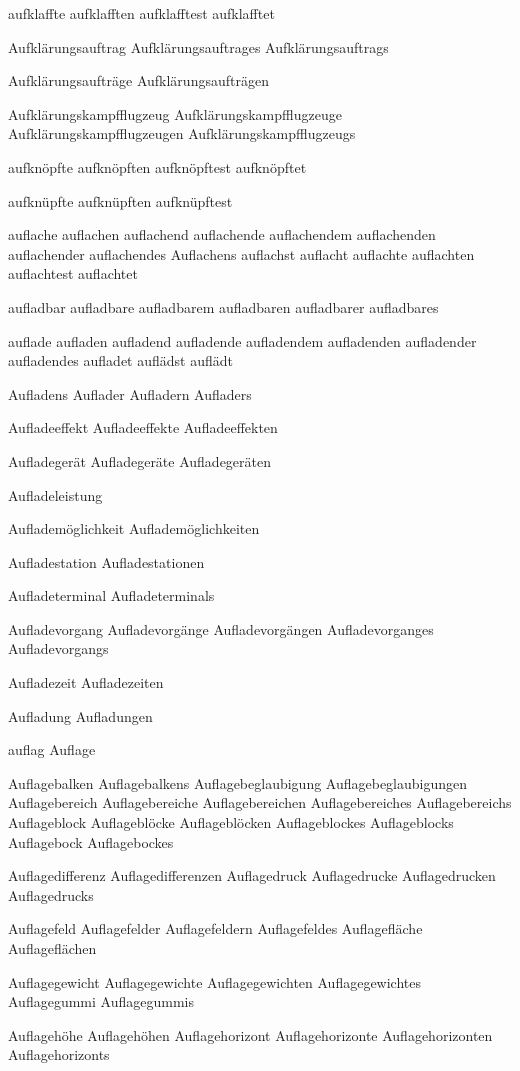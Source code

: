aufklaffte
aufklafften
aufklafftest
aufklafftet

Aufklärungsauftrag
Aufklärungsauftrages
Aufklärungsauftrags

Aufklärungsaufträge
Aufklärungsaufträgen

Aufklärungskampfflugzeug
Aufklärungskampfflugzeuge
Aufklärungskampfflugzeugen
Aufklärungskampfflugzeugs

aufknöpfte
aufknöpften
aufknöpftest
aufknöpftet

aufknüpfte
aufknüpften
aufknüpftest

auflache
auflachen
auflachend
auflachende
auflachendem
auflachenden
auflachender
auflachendes
Auflachens
auflachst
auflacht
auflachte
auflachten
auflachtest
auflachtet

aufladbar
aufladbare
aufladbarem
aufladbaren
aufladbarer
aufladbares

auflade
aufladen
aufladend
aufladende
aufladendem
aufladenden
aufladender
aufladendes
aufladet
auflädst
auflädt

Aufladens
Auflader
Aufladern
Aufladers

Aufladeeffekt
Aufladeeffekte
Aufladeeffekten

Aufladegerät
Aufladegeräte
Aufladegeräten

Aufladeleistung

Auflademöglichkeit
Auflademöglichkeiten

Aufladestation
Aufladestationen

Aufladeterminal
Aufladeterminals

Aufladevorgang
Aufladevorgänge
Aufladevorgängen
Aufladevorganges
Aufladevorgangs

Aufladezeit
Aufladezeiten

Aufladung
Aufladungen

auflag
Auflage

Auflagebalken
Auflagebalkens
Auflagebeglaubigung
Auflagebeglaubigungen
Auflagebereich
Auflagebereiche
Auflagebereichen
Auflagebereiches
Auflagebereichs
Auflageblock
Auflageblöcke
Auflageblöcken
Auflageblockes
Auflageblocks
Auflagebock
Auflagebockes

Auflagedifferenz
Auflagedifferenzen
Auflagedruck
Auflagedrucke
Auflagedrucken
Auflagedrucks

Auflagefeld
Auflagefelder
Auflagefeldern
Auflagefeldes
Auflagefläche
Auflageflächen

Auflagegewicht
Auflagegewichte
Auflagegewichten
Auflagegewichtes
Auflagegummi
Auflagegummis

Auflagehöhe
Auflagehöhen
Auflagehorizont
Auflagehorizonte
Auflagehorizonten
Auflagehorizonts

